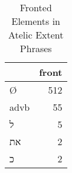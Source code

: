 \begin{table}[htbp!]
\centering
\caption{Fronted Elements in Atelic Extent Phrases}
\label{table:atel_front}
\begin{tabular}{lr}
\toprule
{} &  front \\
\midrule
Ø               &    512 \\
advb            &     55 \\
\texthebrew{ל}  &      5 \\
\texthebrew{את} &      2 \\
\texthebrew{כ}  &      2 \\
\bottomrule
\end{tabular}
\end{table}
